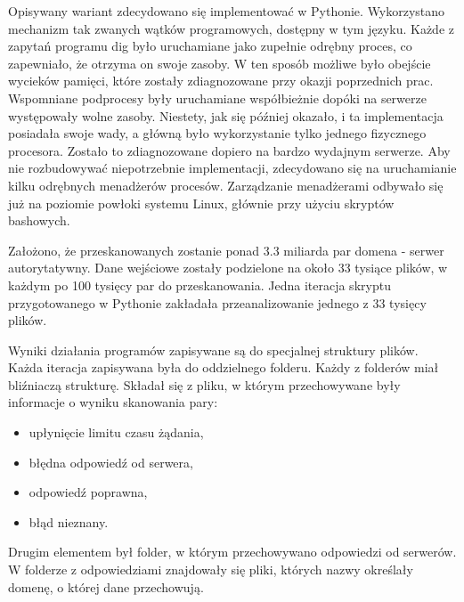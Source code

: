 Opisywany wariant zdecydowano się implementować w Pythonie. Wykorzystano mechanizm tak zwanych wątków programowych, dostępny w tym języku. Każde z zapytań programu dig było uruchamiane jako zupełnie odrębny proces, co zapewniało, że otrzyma on swoje zasoby. W ten sposób możliwe było obejście wycieków pamięci, które zostały zdiagnozowane przy okazji poprzednich prac. Wspomniane podprocesy były uruchamiane współbieżnie dopóki na serwerze występowały wolne zasoby. Niestety, jak się później okazało, i ta implementacja posiadała swoje wady, a główną było wykorzystanie tylko jednego fizycznego procesora. Zostało to zdiagnozowane dopiero na bardzo wydajnym serwerze. Aby nie rozbudowywać niepotrzebnie implementacji, zdecydowano się na uruchamianie kilku odrębnych menadżerów procesów. Zarządzanie menadżerami odbywało się już na poziomie powłoki systemu Linux, głównie przy użyciu skryptów bashowych.

Założono, że przeskanowanych zostanie ponad 3.3 miliarda par domena - serwer autorytatywny. Dane wejściowe zostały podzielone na około 33 tysiące plików, w każdym po 100 tysięcy par do przeskanowania. Jedna iteracja skryptu przygotowanego w Pythonie zakładała przeanalizowanie jednego z 33 tysięcy plików.

Wyniki działania programów zapisywane są do specjalnej struktury plików. Każda iteracja zapisywana była do oddzielnego folderu. Każdy z folderów miał bliźniaczą strukturę. Składał się z pliku, w którym przechowywane były informacje o wyniku skanowania pary:
\begin{itemize}
    \item upłynięcie limitu czasu żądania,
    \item błędna odpowiedź od serwera,
    \item odpowiedź poprawna,
    \item błąd nieznany.
\end{itemize}
Drugim elementem był folder, w którym przechowywano odpowiedzi od serwerów. W folderze z odpowiedziami znajdowały się pliki, których nazwy określały domenę, o której dane przechowują. 

